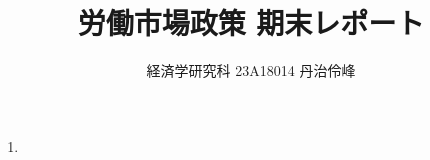 \documentclass{jsarticle}
\begin{document}
\title{労働市場政策 期末レポート}
\author{経済学研究科 23A18014 丹治伶峰}
\date{}
\maketitle

\begin{enumerate}

\item 

\end{enumerate}
\end{document}
